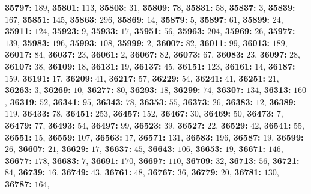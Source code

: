 \textsf{\bfseries 35797:} $189$, \textsf{\bfseries 35801:} $113$, \textsf{\bfseries 35803:} $31$, \textsf{\bfseries 35809:} $78$, \textsf{\bfseries 35831:} $58$, \textsf{\bfseries 35837:} $3$, \textsf{\bfseries 35839:} $167$, \textsf{\bfseries 35851:} $145$, \textsf{\bfseries 35863:} $296$, \textsf{\bfseries 35869:} $14$, \textsf{\bfseries 35879:} $5$, \textsf{\bfseries 35897:} $61$, \textsf{\bfseries 35899:} $24$, \textsf{\bfseries 35911:} $124$, \textsf{\bfseries 35923:} $9$, \textsf{\bfseries 35933:} $17$, \textsf{\bfseries 35951:} $56$, \textsf{\bfseries 35963:} $204$, \textsf{\bfseries 35969:} $26$, \textsf{\bfseries 35977:} $139$, \textsf{\bfseries 35983:} $196$, \textsf{\bfseries 35993:} $108$, \textsf{\bfseries 35999:} $2$, \textsf{\bfseries 36007:} $82$, \textsf{\bfseries 36011:} $99$, \textsf{\bfseries 36013:} $189$, \textsf{\bfseries 36017:} $84$, \textsf{\bfseries 36037:} $23$, \textsf{\bfseries 36061:} $2$, \textsf{\bfseries 36067:} $82$, \textsf{\bfseries 36073:} $67$, \textsf{\bfseries 36083:} $23$, \textsf{\bfseries 36097:} $28$, \textsf{\bfseries 36107:} $38$, \textsf{\bfseries 36109:} $18$, \textsf{\bfseries 36131:} $19$, \textsf{\bfseries 36137:} $45$, \textsf{\bfseries 36151:} $123$, \textsf{\bfseries 36161:} $14$, \textsf{\bfseries 36187:} $159$, \textsf{\bfseries 36191:} $17$, \textsf{\bfseries 36209:} $41$, \textsf{\bfseries 36217:} $57$, \textsf{\bfseries 36229:} $54$, \textsf{\bfseries 36241:} $41$, \textsf{\bfseries 36251:} $21$, \textsf{\bfseries 36263:} $3$, \textsf{\bfseries 36269:} $10$, \textsf{\bfseries 36277:} $80$, \textsf{\bfseries 36293:} $18$, \textsf{\bfseries 36299:} $74$, \textsf{\bfseries 36307:} $134$, \textsf{\bfseries 36313:} $160$, \textsf{\bfseries 36319:} $52$, \textsf{\bfseries 36341:} $95$, \textsf{\bfseries 36343:} $78$, \textsf{\bfseries 36353:} $55$, \textsf{\bfseries 36373:} $26$, \textsf{\bfseries 36383:} $12$, \textsf{\bfseries 36389:} $119$, \textsf{\bfseries 36433:} $78$, \textsf{\bfseries 36451:} $253$, \textsf{\bfseries 36457:} $152$, \textsf{\bfseries 36467:} $30$, \textsf{\bfseries 36469:} $50$, \textsf{\bfseries 36473:} $7$, \textsf{\bfseries 36479:} $77$, \textsf{\bfseries 36493:} $54$, \textsf{\bfseries 36497:} $99$, \textsf{\bfseries 36523:} $39$, \textsf{\bfseries 36527:} $22$, \textsf{\bfseries 36529:} $42$, \textsf{\bfseries 36541:} $55$, \textsf{\bfseries 36551:} $15$, \textsf{\bfseries 36559:} $107$, \textsf{\bfseries 36563:} $17$, \textsf{\bfseries 36571:} $131$, \textsf{\bfseries 36583:} $196$, \textsf{\bfseries 36587:} $19$, \textsf{\bfseries 36599:} $26$, \textsf{\bfseries 36607:} $21$, \textsf{\bfseries 36629:} $17$, \textsf{\bfseries 36637:} $45$, \textsf{\bfseries 36643:} $106$, \textsf{\bfseries 36653:} $19$, \textsf{\bfseries 36671:} $146$, \textsf{\bfseries 36677:} $178$, \textsf{\bfseries 36683:} $7$, \textsf{\bfseries 36691:} $170$, \textsf{\bfseries 36697:} $110$, \textsf{\bfseries 36709:} $32$, \textsf{\bfseries 36713:} $56$, \textsf{\bfseries 36721:} $84$, \textsf{\bfseries 36739:} $16$, \textsf{\bfseries 36749:} $43$, \textsf{\bfseries 36761:} $48$, \textsf{\bfseries 36767:} $36$, \textsf{\bfseries 36779:} $20$, \textsf{\bfseries 36781:} $130$, \textsf{\bfseries 36787:} $164$, 
